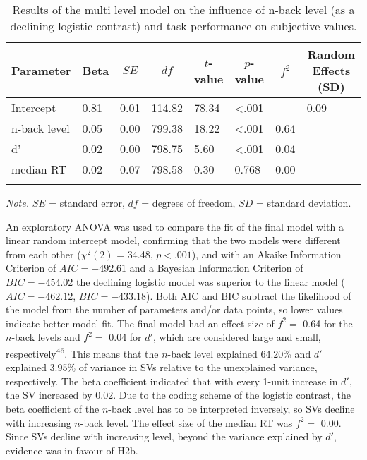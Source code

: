 \documentclass[
  man,floatsintext]{apa6}
\begin{document}
\begin{table}[H]

\begin{center}
\begin{threeparttable}

\caption{\label{tab:H2b-results}Results of the multi level model on the influence of n-back level (as a declining logistic contrast) and task performance on subjective values.}

\begin{tabular}{llllllll}
\toprule
Parameter & \multicolumn{1}{c}{Beta} & \multicolumn{1}{c}{$SE$} & \multicolumn{1}{c}{$df$} & \multicolumn{1}{c}{$t$-value} & \multicolumn{1}{c}{$p$-value} & \multicolumn{1}{c}{$f^{2}$} & \multicolumn{1}{c}{Random Effects (SD)}\\
\midrule
Intercept & 0.81 & 0.01 & 114.82 & 78.34 & <.001 &  & 0.09\\
n-back level & 0.05 & 0.00 & 799.38 & 18.22 & <.001 & 0.64 & \\
d' & 0.02 & 0.00 & 798.75 & 5.60 & <.001 & 0.04 & \\
median RT & 0.02 & 0.07 & 798.58 & 0.30 & 0.768 & 0.00 & \\
\bottomrule
\addlinespace
\end{tabular}

\begin{tablenotes}[para]
\normalsize{\textit{Note.} $SE$ = standard error, $df$ = degrees of freedom, $SD$ = standard deviation.}
\end{tablenotes}

\end{threeparttable}
\end{center}

\end{table}

An exploratory ANOVA was used to compare the fit of the final model with a linear random intercept model, confirming that the two models were different from each other (\(\chi^2 (2)\) = 34.48, \(p<.001\)), and with an Akaike Information Criterion of \(AIC=-492.61\) and a Bayesian Information Criterion of \(BIC=-454.02\) the declining logistic model was superior to the linear model (\(AIC=-462.12\), \(BIC=-433.18\)).
Both AIC and BIC subtract the likelihood of the model from the number of parameters and/or data points, so lower values indicate better model fit.
The final model had an effect size of \(f^{2}=\) 0.64 for the \(n\)-back levels and \(f^{2}=\) 0.04 for \(d'\), which are considered large and small, respectively\textsuperscript{46}.
This means that the \(n\)-back level explained 64.20\% and \(d'\) explained 3.95\% of variance in SVs relative to the unexplained variance, respectively.
The beta coefficient indicated that with every 1-unit increase in \(d'\), the SV increased by 0.02.
Due to the coding scheme of the logistic contrast, the beta coefficient of the \(n\)-back level has to be interpreted inversely, so SVs decline with increasing \(n\)-back level.
The effect size of the median RT was \(f^{2}=\) 0.00.
Since SVs decline with increasing level, beyond the variance explained by \(d'\), evidence was in favour of H2b.
\end{document}
